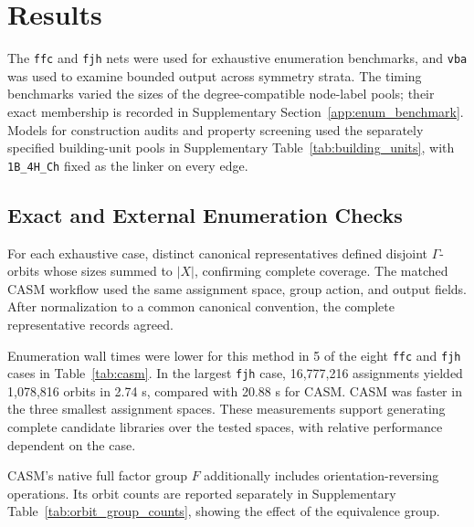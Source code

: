 \documentclass[a5paper, 10pt]{article}
\begin{document}
\section{Results}

The \texttt{ffc} and \texttt{fjh} nets were used for exhaustive enumeration benchmarks, and \texttt{vba} was used to examine bounded output across symmetry strata. The timing benchmarks varied the sizes of the degree-compatible node-label pools; their exact membership is recorded in Supplementary Section~\ref{app:enum_benchmark}. Models for construction audits and property screening used the separately specified building-unit pools in Supplementary Table~\ref{tab:building_units}, with \texttt{1B\_4H\_Ch} fixed as the linker on every edge.

\subsection{Exact and External Enumeration Checks}

For each exhaustive case, distinct canonical representatives defined disjoint $\Gamma$-orbits whose sizes summed to $|X|$, confirming complete coverage. The matched CASM workflow used the same assignment space, group action, and output fields. After normalization to a common canonical convention, the complete representative records agreed.

Enumeration wall times were lower for this method in 5 of the eight \texttt{ffc} and \texttt{fjh} cases in Table~\ref{tab:casm}. In the largest \texttt{fjh} case, 16,777,216 assignments yielded 1,078,816 orbits in 2.74 s, compared with 20.88 s for CASM. CASM was faster in the three smallest assignment spaces. These measurements support generating complete candidate libraries over the tested spaces, with relative performance dependent on the case.

CASM's native full factor group $F$ additionally includes orientation-reversing operations. Its orbit counts are reported separately in Supplementary Table~\ref{tab:orbit_group_counts}, showing the effect of the equivalence group.
\end{document}
